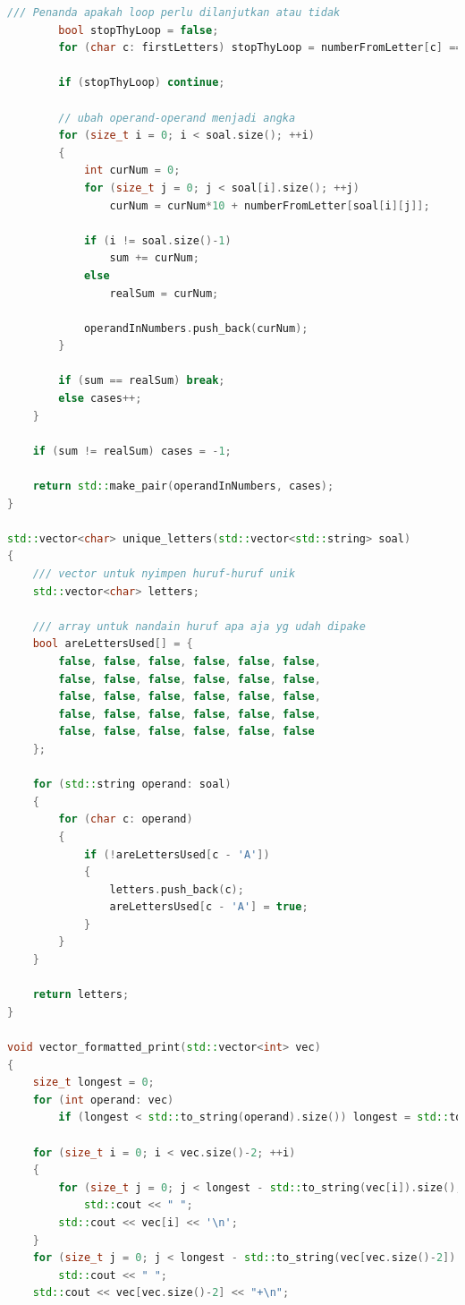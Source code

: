 \documentclass{article}
\begin{document}
\begin{lstlisting}[caption = main.cpp, language = c++]
        /// Penanda apakah loop perlu dilanjutkan atau tidak
        bool stopThyLoop = false;
        for (char c: firstLetters) stopThyLoop = numberFromLetter[c] == 0;

        if (stopThyLoop) continue;

        // ubah operand-operand menjadi angka
        for (size_t i = 0; i < soal.size(); ++i)
        {
            int curNum = 0;
            for (size_t j = 0; j < soal[i].size(); ++j)
                curNum = curNum*10 + numberFromLetter[soal[i][j]];

            if (i != soal.size()-1)
                sum += curNum;
            else
                realSum = curNum;

            operandInNumbers.push_back(curNum);
        }

        if (sum == realSum) break;
        else cases++;
    }

    if (sum != realSum) cases = -1;

    return std::make_pair(operandInNumbers, cases);
}

std::vector<char> unique_letters(std::vector<std::string> soal)
{
    /// vector untuk nyimpen huruf-huruf unik
    std::vector<char> letters;

    /// array untuk nandain huruf apa aja yg udah dipake
    bool areLettersUsed[] = {
        false, false, false, false, false, false,
        false, false, false, false, false, false,
        false, false, false, false, false, false,
        false, false, false, false, false, false,
        false, false, false, false, false, false
    };

    for (std::string operand: soal)
    {
        for (char c: operand)
        {
            if (!areLettersUsed[c - 'A'])
            {
                letters.push_back(c);
                areLettersUsed[c - 'A'] = true;
            }
        }
    }

    return letters;
}

void vector_formatted_print(std::vector<int> vec)
{
    size_t longest = 0;
    for (int operand: vec)
        if (longest < std::to_string(operand).size()) longest = std::to_string(operand).size();

    for (size_t i = 0; i < vec.size()-2; ++i)
    {
        for (size_t j = 0; j < longest - std::to_string(vec[i]).size(); ++j) // ngasih spasi
            std::cout << " ";
        std::cout << vec[i] << '\n';
    }
    for (size_t j = 0; j < longest - std::to_string(vec[vec.size()-2]).size(); ++j) // ngasih spasi
        std::cout << " ";
    std::cout << vec[vec.size()-2] << "+\n";


\end{lstlisting}
\end{document}
